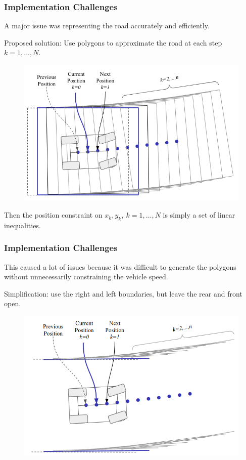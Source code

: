 \documentclass{beamer}
\begin{document}
\begin{frame}
\frametitle{Implementation Challenges}
A major issue was representing the road accurately and efficiently.

Proposed solution: Use polygons to approximate the road at each step  $k=1,\dots,N$.
\vspace{-0.5em}
\begin{figure}
\includegraphics[width=0.7\linewidth]{figures/road_polygons.png}
\end{figure}
\vspace{-0.5em}
Then the position constraint on $x_k,y_k,\ k=1,\dots,N$ is simply a set of linear inequalities.
\end{frame}

\begin{frame}
\frametitle{Implementation Challenges}
This caused a lot of issues because it was difficult to generate the polygons without unnecessarily constraining the vehicle speed.

Simplification: use the right and left boundaries, but leave the rear and front open.

\vspace{-0.25em}
\begin{figure}
	\includegraphics[width=0.7\linewidth]{figures/road_final_bounds.png}
\end{figure}
\vspace{-0.5em}

\end{frame}
\end{document}
